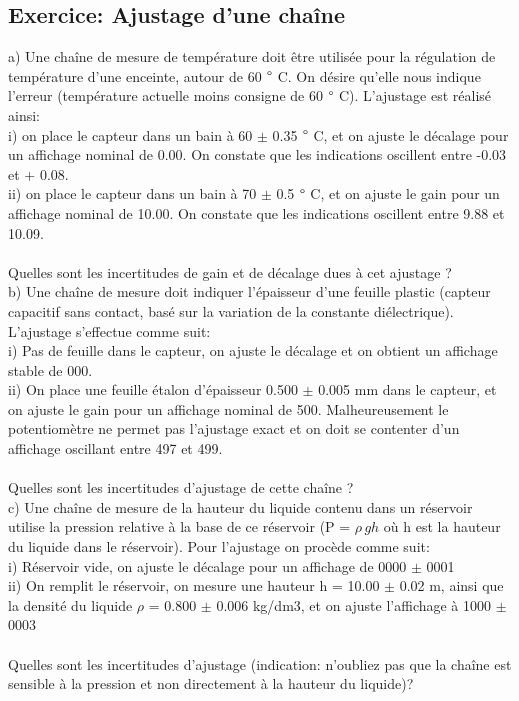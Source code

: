 \subsection{Exercice: Ajustage d'une chaîne}
a)	Une chaîne de mesure de température doit être utilisée pour la régulation de température d'une enceinte, autour de 60 $\degree$ C. On désire qu'elle nous indique l'erreur (température actuelle moins consigne de 60 $\degree$ C). L'ajustage est réalisé ainsi: \\
i)	on place le capteur dans un bain à 60 $\pm$ 0.35 $\degree$ C, et on ajuste le décalage pour un affichage nominal de 0.00. On constate que les indications oscillent entre -0.03 et + 0.08. \\
ii)	on place le capteur dans un bain à 70 $\pm$ 0.5 $\degree$ C, et on ajuste le gain pour un affichage nominal de 10.00. On constate que les indications oscillent entre 9.88 et 10.09. \\  ~ \\
Quelles sont les incertitudes de gain et de décalage dues à cet ajustage ? \\

b)	Une chaîne de mesure doit indiquer l'épaisseur d'une feuille plastic (capteur capacitif sans contact, basé sur la variation de la constante diélectrique). L'ajustage s'effectue comme suit: \\
i)	Pas de feuille dans le capteur, on ajuste le décalage et on obtient un affichage stable de 000. \\
ii)	On place une feuille étalon d'épaisseur 0.500  $\pm$  0.005 mm dans le capteur, et on ajuste le gain pour un affichage nominal de 500. Malheureusement le potentiomètre ne permet pas l'ajustage exact et on doit se contenter d'un affichage oscillant entre 497 et 499. \\~ \\
Quelles sont les incertitudes d'ajustage de cette chaîne ? \\

c)	Une chaîne de mesure de la hauteur du liquide contenu dans un réservoir utilise la pression relative à la base de ce réservoir (P = $\rho\,gh$ où h est la hauteur du liquide dans le réservoir). Pour l'ajustage on procède comme suit: \\
i)	Réservoir vide, on ajuste le décalage pour un affichage de 0000  $\pm$  0001 \\
ii)	On remplit le réservoir, on mesure une hauteur h = 10.00 $\pm$ 0.02 m, ainsi que la densité du liquide  $\rho$ = 0.800  $\pm$  0.006 kg/dm3, et on ajuste l'affichage à 1000  $\pm$  0003 \\ ~ \\
Quelles sont les incertitudes d'ajustage (indication: n'oubliez pas que la chaîne est sensible à la pression et non directement à la hauteur du liquide)? \\

